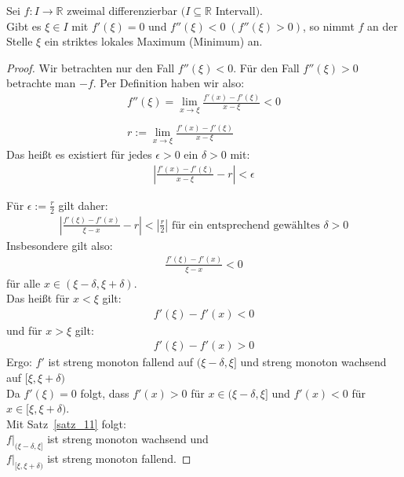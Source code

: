 \begin{Satz}{
	Sei $f: I \rightarrow \mathbb{R}$ zweimal differenzierbar $(I \subseteq 
	\mathbb{R}$ Intervall$)$.\\
	Gibt es $\xi \in I$ mit $f'(\xi) = 0$ und 
	$f''(\xi) < 0 \; (f''(\xi)> 0)$, so nimmt $f$ an der Stelle $\xi$ ein 
	striktes lokales Maximum (Minimum) an.
}\end{Satz}

\begin{proof}
	Wir betrachten nur den Fall $f''(\xi) < 0$.
	Für den Fall $f''(\xi) > 0$ \\betrachte man $-f$.
	Per Definition haben wir also: 
	\begin{align*}
		f''(\xi) = \lim\limits_{x \rightarrow \xi}{\frac{f'(x) - f'(\xi)}{x - \xi} }
		< 0 \\
		\\
		r := \lim\limits_{x \rightarrow \xi}{\frac{f'(x) - f'(\xi)}{x - \xi} }
	\end{align*}
	Das heißt es existiert für jedes $ \epsilon > 0$ ein $\delta > 0$ mit:
	\begin{align*}
		\left\vert \frac{f'(x) - f'(\xi)}{x - \xi} - r \right\vert < \epsilon
	\end{align*}
	
	Für $\epsilon := \frac{r}{2}$ gilt daher: 
	\begin{align*}
		\left\vert \frac{f'(\xi) - f'(x)}{\xi - x}-r \right\vert < \left\vert \frac{r}{2} \right\vert  \text{ für ein entsprechend gewähltes } \delta > 0
	\end{align*}
 Insbesondere gilt also:
	\begin{align*}
		\frac{f'(\xi)-f'(x)}{\xi - x} < 0
	\end{align*}
	für alle $ x \in ( \xi - \delta, \xi + \delta)$.\\
	Das heißt für $x < \xi$ gilt: 
	\begin{align*}
		f'(\xi) - f'(x) < 0
	\end{align*}
	und für $ x > \xi$ gilt: 
	\begin{align*}
		f'(\xi) - f'(x) > 0
	\end{align*}
	Ergo: $f'$ ist streng monoton fallend auf $(\xi - \delta, \xi]$ und 
	streng monoton wachsend auf $[ \xi, \xi + \delta)$ \\
	Da $f'(\xi) = 0$ folgt, dass $f'(x) > 0$ für $x \in (\xi-\delta, \xi]$
	und $f'(x) <0 $ für $x \in [\xi, \xi + \delta)$.\\
	  Mit Satz~\ref{satz_11} folgt: \\
	  	\hspace*{5mm}$f|_{(\xi-\delta, \xi]}$ ist streng monoton wachsend und \\
	  	\hspace*{5mm}$f|_{[\xi, \xi + \delta)}$ ist streng monoton fallend.
\end{proof}


